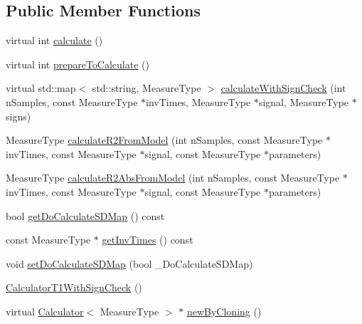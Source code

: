 \subsection*{Public Member Functions}
\begin{DoxyCompactItemize}
\item 
virtual int \hyperlink{class_ox_1_1_calculator_t1_with_sign_check_ae5b9cb33d60b5c4d96f8890b3ca991c4}{calculate} ()
\item 
virtual int \hyperlink{class_ox_1_1_calculator_t1_with_sign_check_ad93dba810e34daf87ac35839cb0ff671}{prepare\+To\+Calculate} ()
\item 
virtual std\+::map$<$ std\+::string, Measure\+Type $>$ \hyperlink{class_ox_1_1_calculator_t1_with_sign_check_af6f5e9b8fabb1a71ace382c33621d779}{calculate\+With\+Sign\+Check} (int n\+Samples, const Measure\+Type $\ast$inv\+Times, Measure\+Type $\ast$signal, Measure\+Type $\ast$signs)
\item 
Measure\+Type \hyperlink{class_ox_1_1_calculator_t1_with_sign_check_ae82a4e5122366ec8ed11c52633b842eb}{calculate\+R2\+From\+Model} (int n\+Samples, const Measure\+Type $\ast$inv\+Times, const Measure\+Type $\ast$signal, const Measure\+Type $\ast$parameters)
\item 
Measure\+Type \hyperlink{class_ox_1_1_calculator_t1_with_sign_check_a08dfb14e6c69bbf05394512cd1f0ab9a}{calculate\+R2\+Abs\+From\+Model} (int n\+Samples, const Measure\+Type $\ast$inv\+Times, const Measure\+Type $\ast$signal, const Measure\+Type $\ast$parameters)
\item 
bool \hyperlink{class_ox_1_1_calculator_t1_with_sign_check_ab4a3d7795d055bc22b7da2db83c44e1f}{get\+Do\+Calculate\+S\+D\+Map} () const 
\item 
const Measure\+Type $\ast$ \hyperlink{class_ox_1_1_calculator_t1_with_sign_check_ab6cd6c2a3d32b153d78839230582c793}{get\+Inv\+Times} () const 
\item 
void \hyperlink{class_ox_1_1_calculator_t1_with_sign_check_a1e08ddf2db6d50734abbe015d1e796e1}{set\+Do\+Calculate\+S\+D\+Map} (bool \+\_\+\+Do\+Calculate\+S\+D\+Map)
\item 
\hyperlink{class_ox_1_1_calculator_t1_with_sign_check_a964319b777d2e4c703647208117aca3f}{Calculator\+T1\+With\+Sign\+Check} ()
\item 
virtual \hyperlink{class_ox_1_1_calculator}{Calculator}$<$ Measure\+Type $>$ $\ast$ \hyperlink{class_ox_1_1_calculator_t1_with_sign_check_a59e5be9935b9c235f4958a461fda081e}{new\+By\+Cloning} ()
\end{DoxyCompactItemize}
